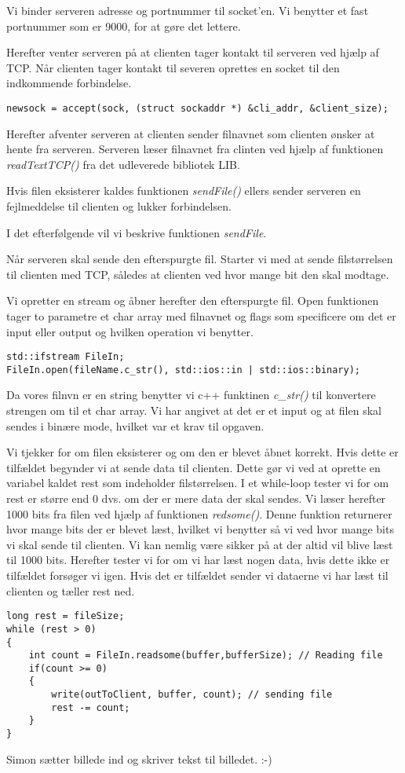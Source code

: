 Vi binder serveren adresse og portnummer til socket'en. Vi benytter et fast portnummer som er 9000, for at gøre det lettere. 

Herefter venter serveren på at clienten tager kontakt til serveren ved hjælp af TCP. Når clienten tager kontakt til severen oprettes en socket til den indkommende forbindelse. 

\begin{lstlisting}
newsock = accept(sock, (struct sockaddr *) &cli_addr, &client_size);
\end{lstlisting}

Herefter afventer serveren at clienten sender filnavnet som clienten ønsker at hente fra serveren. Serveren læser filnavnet fra clinten ved hjælp af funktionen \textit{readTextTCP()} fra det udleverede bibliotek LIB. 

Hvis filen eksisterer kaldes funktionen \textit{sendFile()} ellers sender serveren en fejlmeddelse til clienten og lukker forbindelsen. 

I det efterfølgende vil vi beskrive funktionen \textit{sendFile}. 

Når serveren skal sende den efterspurgte fil. Starter vi med at sende filstørrelsen til clienten med TCP, således at clienten ved hvor mange bit den skal modtage. 

Vi opretter en stream og åbner herefter den efterspurgte fil. Open funktionen tager to parametre et char array med filnavnet og flags som specificere om det er input eller output og hvilken operation vi benytter. 

\begin{lstlisting}
std::ifstream FileIn; 
FileIn.open(fileName.c_str(), std::ios::in | std::ios::binary);
\end{lstlisting}

Da vores filnvn er en string benytter vi c++ funktinen \textit{c\_str()} til konvertere strengen om til et char array. Vi har angivet at det er et input og at filen skal sendes i binære mode, hvilket var et krav til opgaven. 

Vi tjekker for om filen eksisterer og om den er blevet åbnet korrekt.
Hvis dette er tilfældet begynder vi at sende data til clienten. Dette gør vi ved at oprette en variabel kaldet rest som indeholder filstørrelsen. 
I et while-loop tester vi for om rest er større end 0 dvs. om der er mere data der skal sendes. 
Vi læser herefter 1000 bits fra filen ved hjælp af funktionen \textit{redsome()}. Denne funktion returnerer hvor mange bits der er blevet læst, hvilket vi benytter så vi ved hvor mange bits vi skal sende til clienten. Vi kan nemlig være sikker på at der altid vil blive læst til 1000 bits. 
Herefter tester vi for om vi har læst nogen data, hvis dette ikke er tilfældet forsøger vi igen. Hvis det er tilfældet sender vi dataerne vi har læst til clienten og tæller rest ned. 

\begin{lstlisting}
long rest = fileSize;
while (rest > 0)
{
	int count = FileIn.readsome(buffer,bufferSize); // Reading file 
	if(count >= 0)
	{
		write(outToClient, buffer, count); // sending file
		rest -= count;
	}
}
\end{lstlisting}

Simon sætter billede ind og skriver tekst til billedet. :-)

